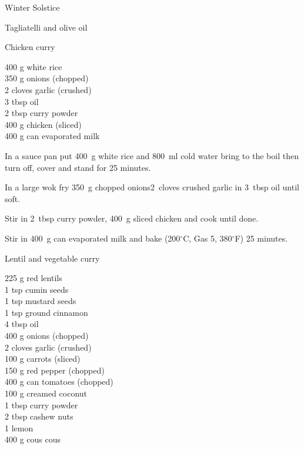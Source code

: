\begin{menu}{Winter Solstice}
\begin{recipe}{1}{Tagliatelli and olive oil}
\begin{instructions}
    \end{instructions}
    \end{recipe}%
  
    \begin{recipe}{2}{Chicken curry}%
    
		\begin{ingredients}
		400 g white rice  \\
	350 g onions (chopped) \\
	2 cloves garlic (crushed) \\
	3 tbsp oil  \\
	2 tbsp curry powder  \\
	400 g chicken (sliced) \\
	400 g can evaporated milk  \\
	
		\end{ingredients}
	
	
    \begin{instructions}
    \item 
      In a
      sauce pan
      put
      400~g  white rice
      and
      800~ml  cold water
      bring to the boil then turn off, cover and stand for 25 minutes.
    \item 
        In a large wok fry
        350~g chopped onions2~cloves crushed garlic
        in
        3~tbsp  oil
        until soft.
      \item 
        Stir in
        2~tbsp  curry powder,
        400~g sliced chicken
        and cook until done.
      \item 
        Stir in
        400~g  can evaporated milk
        and
        bake 
      (200$^{\circ}$C, Gas 5, 380$^{\circ}$F)
     25 minutes.
      
    \end{instructions}
    \end{recipe}%
  
    \begin{recipe}{2}{Lentil and vegetable curry}%
    
		\begin{ingredients}
		225 g red lentils  \\
	1 tsp cumin seeds  \\
	1 tsp mustard seeds  \\
	1 tsp ground cinnamon  \\
	4 tbsp oil  \\
	400 g onions (chopped) \\
	2 cloves garlic (crushed) \\
	100 g carrots (sliced) \\
	150 g red pepper (chopped) \\
	400 g can tomatoes (chopped) \\
	100 g creamed coconut  \\
	1 tbsp curry powder  \\
	2 tbsp cashew nuts  \\
	1  lemon  \\
	400 g cous cous  \\
	

\end{ingredients}
\end{recipe}
\end{menu}
